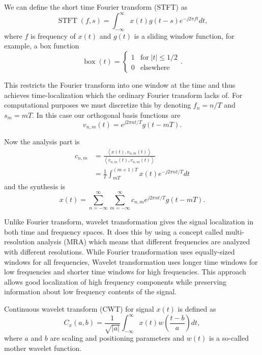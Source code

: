 We can define the short time Fourier transform (STFT) as
\begin{equation}
\operatorname{STFT}(f, s) = \int_{-\infty}^{\infty} x(t) g(t-s) e^{-j 2\pi ft} dt,
\end{equation}
where $f$ is frequency of $x(t)$ and $g(t)$ is a sliding window function, for example, a box function
\begin{equation}
\operatorname{box}(t) = 
\begin{cases}
1 & \text{for} \; |t| \le 1/2 \\
0 & \text{elsewhere}
\end{cases}.
\end{equation}

This restricts the Fourier transform into one window at the time and thus achieves time-localization which the ordinary Fourier transform lacks of. For computational purposes we must discretize this by denoting $f_n = n/T$ and $s_m = mT$. In this case our orthogonal basis functions are
\begin{equation}
v_{n,m} (t) = e^{j 2\pi nt / T} g(t - mT).
\end{equation}

Now the analysis part is
\begin{align}
c_{n,m} &= \frac{\left \langle x(t), v_{n,m}(t) \right \rangle}{\left \langle v_{n,m}(t), v_{n,m}(t) \right \rangle} \\
&= \frac{1}{T} \int_{mT}^{(m+1)T} x(t) e^{-j 2\pi nt / T} dt
\end{align}
and the synthesis is 
\begin{equation}
x(t) = \sum_{n=-\infty}^{\infty} \sum_{m=-\infty}^{\infty} c_{n,m} e^{j 2\pi nt / T} g(t - mT).
\end{equation}

Unlike Fourier transform, wavelet transformation gives the signal localization in both time and frequency spaces. It does this by using a concept called multi-resolution analysis (MRA) which means that different frequencies are analyzed with different resolutions. While Fourier transformation uses equally-sized windows for all frequencies, Wavelet transformation uses longer time windows for low frequencies and shorter time windows for high frequencies. This approach allows good localization of high frequency components while preserving information about low frequency contents of the signal. \cite{Fong04}

Continuous wavelet transform (CWT) for signal $x(t)$ is defined as
\begin{equation}
C_{x}(a,b) = \frac{1}{\sqrt{|a|}} \int_{-\infty}^{\infty} x(t) w \left ( \frac{t - b}{a} \right ) dt,
\end{equation}
where $a$ and $b$ are scaling and positioning parameters and $w(t)$ is a so-called mother wavelet function. \cite{Fong04} 

